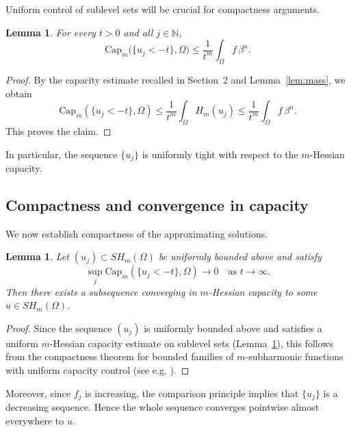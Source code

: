 \documentclass[11pt,reqno]{amsart}
\newtheorem{lemma}[theorem]{Lemma}
\theoremstyle{definition}
\theoremstyle{remark}
\begin{document}
	Uniform control of sublevel sets will be crucial for compactness arguments.
	
	\begin{lemma}\label{lem:capacity}
		 For every $t>0$ and all $j \in \mathbb{N}$,
		\[
		\mathrm{Cap}_m\big(\{u_j < -t\}, \Omega\big)
		\le \frac{1}{t^m} \int_\Omega f \, \beta^n.
		\]
	\end{lemma}
	
	\begin{proof}
		By the capacity estimate recalled in Section~2 and Lemma~\ref{lem:mass}, we obtain
		\[
		\mathrm{Cap}_m(\{u_j<-t\},\Omega)
		\le \frac{1}{t^m} \int_\Omega H_m(u_j)
		\le \frac{1}{t^m} \int_\Omega f \, \beta^n.
		\]
		This proves the claim.
	\end{proof}
	
	In particular, the sequence $\{u_j\}$ is uniformly tight with respect to the $m$-Hessian capacity.
	
	
	\subsection{Compactness and convergence in capacity}
	
	We now establish compactness of the approximating solutions.
	
	\begin{lemma}\label{lem:compact}
		Let $(u_j)\subset SH_m(\Omega)$ be uniformly bounded above and satisfy
		\[
		\sup_j \mathrm{Cap}_m(\{u_j<-t\},\Omega)\to 0 \quad \text{as } t\to\infty.
		\]
		Then there exists a subsequence converging in $m$-Hessian capacity
		to some $u\in SH_m(\Omega)$.
	\end{lemma}
	
	\begin{proof}
		Since the sequence $(u_j)$ is uniformly bounded above and satisfies
		a uniform $m$-Hessian capacity estimate on sublevel sets
		(Lemma~\ref{lem:capacity}), this follows from the compactness theorem for bounded families
		of $m$-subharmonic functions with uniform capacity control
		(see e.g. \cite{DinewKolodziej2014}).
	\end{proof}
	
	
	Moreover, since $f_j$ is increasing, the comparison principle implies that $\{u_j\}$ is a decreasing sequence.
	Hence the whole sequence converges pointwise almost everywhere to $u$.
	
	
\end{document}
